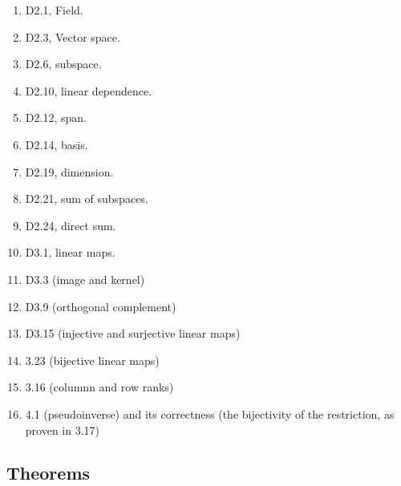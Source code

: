 \documentclass{article}
\begin{document}
\begin{enumerate}
  \item D2.1, Field.
 \item D2.3, Vector space.
\item D2.6, subspace.
 \item D2.10, linear dependence.

 \item D2.12, span.

 \item D2.14, basis.

 \item  D2.19, dimension.

 \item  D2.21, sum of subspaces.

 \item  D2.24, direct sum.

 \item  D3.1, linear maps.

 \item  D3.3 (image and kernel)

 \item  D3.9 (orthogonal complement)

 \item  D3.15 (injective and surjective linear maps)

 \item  3.23 (bijective linear maps)

 \item  3.16 (columnn and row ranks)

 \item  4.1 (pseudoinverse) and its correctness (the bijectivity of the restriction, as proven in 3.17)

\end{enumerate}

\subsection{Theorems}
\end{document}
